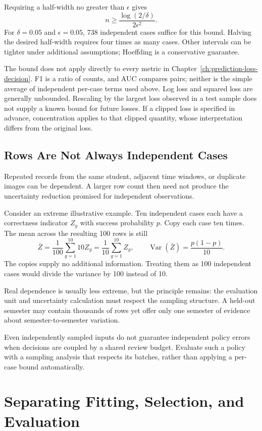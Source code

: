 Requiring a half-width no greater than $\epsilon$ gives
\[
n\ge\frac{\log(2/\delta)}{2\epsilon^2}.
\]
For $\delta=0.05$ and $\epsilon=0.05$, 738 independent cases suffice for this bound. Halving the desired half-width requires four times as many cases. Other intervals can be tighter under additional assumptions; Hoeffding is a conservative guarantee.

The bound does not apply directly to every metric in Chapter~\ref{ch:prediction-loss-decision}. F1 is a ratio of counts, and AUC compares pairs; neither is the simple average of independent per-case terms used above. Log loss and squared loss are generally unbounded. Rescaling by the largest loss observed in a test sample does not supply a known bound for future losses. If a clipped loss is specified in advance, concentration applies to that clipped quantity, whose interpretation differs from the original loss.

\subsection{Rows Are Not Always Independent Cases}

Repeated records from the same student, adjacent time windows, or duplicate images can be dependent. A larger row count then need not produce the uncertainty reduction promised for independent observations.

Consider an extreme illustrative example. Ten independent cases each have a correctness indicator $Z_g$ with success probability $p$. Copy each case ten times. The mean across the resulting 100 rows is still
\[
\bar Z=\frac1{100}\sum_{g=1}^{10}10Z_g
=\frac1{10}\sum_{g=1}^{10}Z_g,
\qquad
\operatorname{Var}(\bar Z)=\frac{p(1-p)}{10}.
\]
The copies supply no additional information. Treating them as 100 independent cases would divide the variance by 100 instead of 10.

Real dependence is usually less extreme, but the principle remains: the evaluation unit and uncertainty calculation must respect the sampling structure. A held-out semester may contain thousands of rows yet offer only one semester of evidence about semester-to-semester variation.

Even independently sampled inputs do not guarantee independent policy errors when decisions are coupled by a shared review budget. Evaluate such a policy with a sampling analysis that respects its batches, rather than applying a per-case bound automatically.

\section{Separating Fitting, Selection, and Evaluation}


